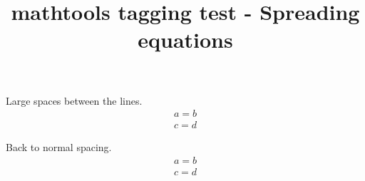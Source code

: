 \documentclass{article}
\title{mathtools tagging test - Spreading equations}
\begin{document}
\begin{spreadlines}{20pt}
Large spaces between the lines.
\begin{gather}
a=b\\
c=d
\end{gather}
\end{spreadlines}
Back to normal spacing.
\begin{gather}
a=b\\
c=d
\end{gather}
\end{document}
